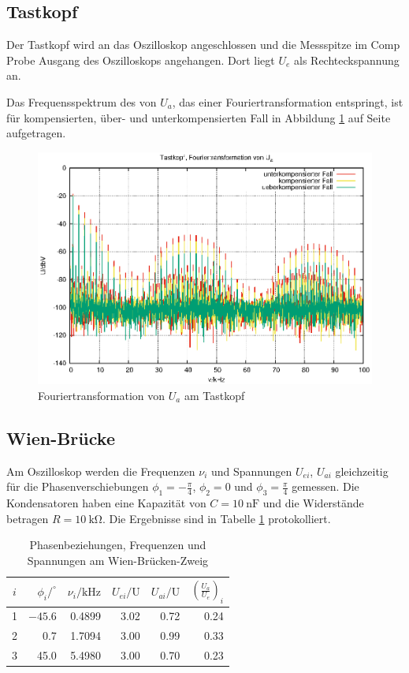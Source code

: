 \documentclass[10pt,a4paper]{scrartcl}
\begin{document}
\subsection {Tastkopf}

Der Tastkopf wird an das Oszilloskop angeschlossen und die Messspitze im
Comp Probe Ausgang des Oszilloskops angehangen.
Dort liegt $U_e$ als Rechteckspannung an.

Das Frequensspektrum des von $U_a$, das einer Fouriertransformation entspringt,
ist für kompensierten, über- und unterkompensierten Fall in
Abbildung \ref{fig:Tastkopf_fourier} auf Seite \pageref{fig:Tastkopf_fourier}
aufgetragen.

\begin{figure}[!ht]
    \centering
    \includegraphics[width=\textwidth]{graphics/tastkopf.eps}
    \caption{Fouriertransformation von $U_a$ am Tastkopf}
    \label{fig:Tastkopf_fourier}
\end{figure}

\subsection {Wien-Brücke}

Am Oszilloskop werden die Frequenzen $\nu_i$ und Spannungen $U_{ei}$, $U_{ai}$
gleichzeitig für die Phasenverschiebungen $\phi_1=-\frac{\pi}{4}$, $\phi_2=0$
und $\phi_3=\frac{\pi}{4}$ gemessen.
Die Kondensatoren haben eine Kapazität von $C=10~\mathrm{nF}$ und die
Widerstände betragen $R=10~\mathrm{k\Omega}$.
Die Ergebnisse sind in Tabelle \ref{tb:Wien} protokolliert.

\begin{table}[!ht]
    \centering
    \caption{Phasenbeziehungen, Frequenzen und Spannungen am Wien-Brücken-Zweig}
    \label{tb:Wien}
    \begin{tabular}{c|r|r|r|r|r}
        $i$&$\phi_i/^\circ$&$\nu_i/\mathrm{kHz}$&$U_{ei}/\mathrm U$
        &$U_{ai}/\mathrm U$&$\left(\frac{U_a}{U_e}\right)_i$
        \\\hline
        1&$-45.6$&0.4899&3.02&0.72&0.24\\
        2&0.7&1.7094&3.00&0.99&0.33\\
        3&45.0&5.4980&3.00&0.70&0.23\\
    \end{tabular}
\end{table}
\end{document}
